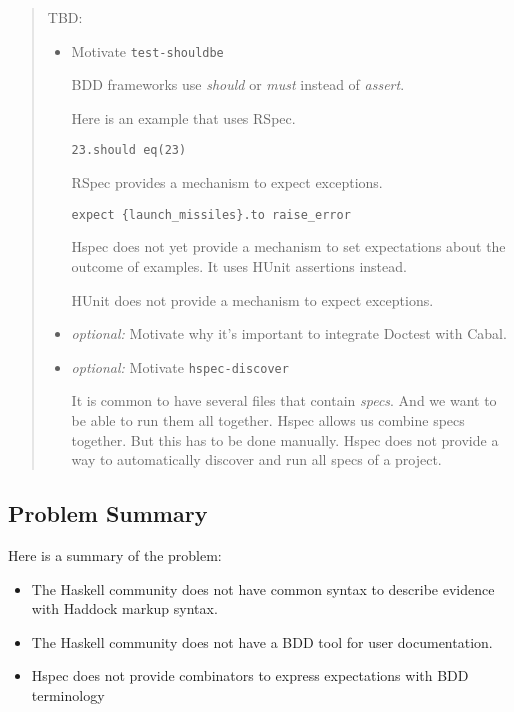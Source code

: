 \documentclass[preprint]{sigplanconf}
\begin{document}
\begin{quote}
    TBD:
\begin{itemize}
    \item Motivate \verb|test-shouldbe|

        BDD frameworks use \emph{should} or \emph{must} instead of
        \emph{assert}.

        Here is an example that uses RSpec.

        \begin{verbatim}
23.should eq(23)
        \end{verbatim}

        RSpec provides a mechanism to expect exceptions.

        \begin{verbatim}
expect {launch_missiles}.to raise_error
        \end{verbatim}

        Hspec does not yet provide a mechanism to set expectations
        about the outcome of examples.  It uses HUnit assertions
        instead.

        HUnit does not provide a mechanism to expect exceptions.

    \item \emph{optional:} Motivate why it's important to integrate
        Doctest with
        Cabal.

    \item \emph{optional:} Motivate \verb|hspec-discover|

        It is common to have several files that contain \emph{specs}.
        And we want to be able to run them all together.  Hspec allows
        us combine specs together.  But this has to be done manually.
        Hspec does not provide a way to automatically discover and run
        all specs of a project.
\end{itemize}
\end{quote}

\subsection{Problem Summary}

Here is a summary of the problem:

\begin{itemize}
\item
    The Haskell community does not have common syntax to describe
    evidence with Haddock markup syntax.
\item
    The Haskell community does not have a BDD tool for user documentation.
\item
    Hspec does not provide combinators to express expectations with
    BDD terminology
\end{itemize}
\end{document}
